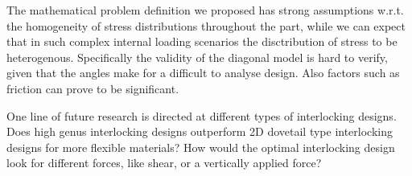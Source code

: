 The mathematical problem definition we proposed has strong assumptions w.r.t. the homogeneity of stress distributions throughout the part,
while we can expect that in such complex internal loading scenarios the disctribution of stress to be heterogenous.
Specifically the validity of the diagonal model is hard to verify, given that the angles make for a difficult to analyse design.
Also factors such as friction can prove to be significant.

One line of future research is directed at different types of interlocking designs.
Does high genus interlocking designs outperform 2D dovetail type interlocking designs for more flexible materials?
How would the optimal interlocking design look for different forces, like shear, or a vertically applied force?
